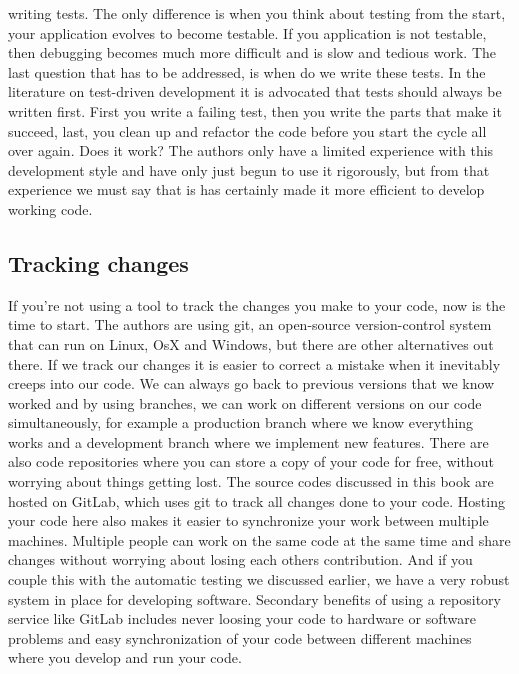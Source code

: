 writing tests. The only difference is when you think about testing from the
start, your application evolves to become testable. If you application is not
testable, then debugging becomes much more difficult and is slow and tedious
work.
The last question that has to be addressed, is when do we write these tests. In
the literature on test-driven development it is advocated that tests should
always be written first. First you write a failing test, then you write the
parts that make it succeed, last, you clean up and refactor the code before you
start the cycle all over again. Does it work? The authors only have a limited
experience with this development style and have only just begun to use it
rigorously, but from that experience we must say that is has certainly made it
more efficient to develop working code.

\subsection{Tracking changes}
If you're not using a tool to track the changes you make to your code, now is
the time to start. The authors are using git, an open-source version-control
system that can run on Linux, OsX and Windows, but there are other alternatives
out there. If we track our changes it is easier to correct a mistake when it
inevitably creeps into our code. We can always go back to previous versions that
we know worked and by using branches, we can work on different versions on our
code simultaneously, for example a production branch where we know everything
works and a development branch where we implement new features. There are also
code repositories where you can store a copy of your code for free, without
worrying about things getting lost. The source codes discussed in this book are
hosted on GitLab, which uses git to track all changes done to your code. Hosting
your code here also makes it easier to synchronize your work between multiple
machines. Multiple people can work on the same code at the same time and share
changes without worrying about losing each others contribution. And if you
couple this with the automatic testing we discussed earlier, we have a very
robust system in place for developing software. Secondary benefits of using a
repository service like GitLab includes never loosing your code to hardware or
software problems and easy synchronization of your code between different
machines where you develop and run your code.

